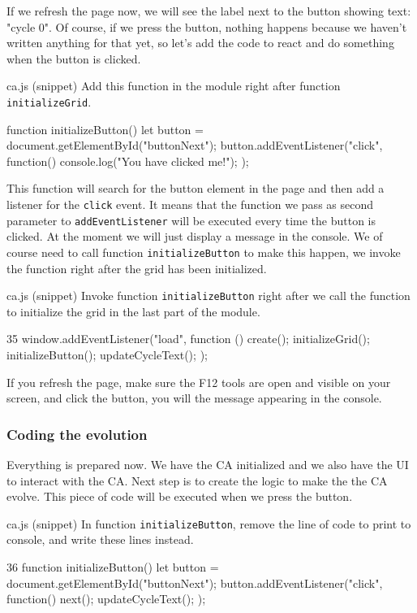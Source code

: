 If we refresh the page now, we will see the label next to the button showing text: "cycle 0". Of course,
if we press the button, nothing happens because we haven't written anything for that yet, so let's add
the code to react and do something when the button is clicked.

\begin{programcode}{ca.js (snippet)}
Add this function in the module right after function \texttt{initializeGrid}.
\begin{code}
function initializeButton() {
  let button = document.getElementById("buttonNext");
  button.addEventListener("click", function(){
    console.log("You have clicked me!");
  });
}
\end{code}
\end{programcode}

This function will search for the button element in the page and then add a listener for the \texttt{click}
event. It means that the function we pass as second parameter to \texttt{addEventListener} will be executed
every time the button is clicked. At the  moment we will just display a message in the console. We
of course need to call function \texttt{initializeButton} to make this happen, we invoke the function
right after the grid has been initialized.

\begin{programcode}{ca.js (snippet)}
Invoke function \texttt{initializeButton} right after we call the function to initialize the grid in
the last part of the module.
\begin{codeh1}{3}{5}
window.addEventListener("load", function () {
  create();
  initializeGrid();
  initializeButton();
  updateCycleText();
});
\end{codeh1}
\end{programcode}

If you refresh the page, make sure the F12 tools are open and visible on your screen, and click the button,
you will the message appearing in the console.

\subsubsection{Coding the evolution}
Everything is prepared now. We have the CA initialized and we also have the UI to interact with the CA.
Next step is to create the logic to make the the CA evolve.
This piece of code will be executed when we press the button.

\begin{programcode}{ca.js (snippet)}
In function \texttt{initializeButton}, remove the line of code to print to console, and write these lines
instead.
\begin{codeh1}{3}{6}
function initializeButton() {
  let button = document.getElementById("buttonNext");
  button.addEventListener("click", function(){
    next();
    updateCycleText();
  });
}
\end{codeh1}
\end{programcode}

